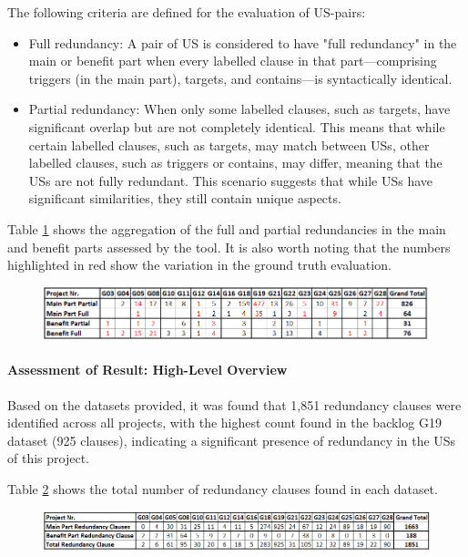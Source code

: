 The following criteria are defined for the evaluation of US-pairs:
\begin{itemize}
	\item Full redundancy: 	A pair of US is considered to have "full redundancy" in the main or benefit part when every labelled clause in that part—comprising triggers (in the main part), targets, and contains—is syntactically identical.
	
	\item Partial redundancy: When only some labelled clauses, such as targets, have significant overlap but are not completely identical. This means that while certain labelled clauses, such as targets, may match between USs, other labelled clauses, such as triggers or contains, may differ, meaning that the USs are not fully redundant. This scenario suggests that while USs have significant similarities, they still contain unique aspects.
\end{itemize}
Table \ref{tb:tool} shows the aggregation of the full and partial redundancies in the main and benefit parts assessed by the tool. It is also worth noting that the numbers highlighted in red show the variation in the ground truth evaluation.
\begin{figure}[h]
	\begingroup
	\scriptsize
	\centering
	\includegraphics[scale=0.6]{Table/tool.png}
	\label{tb:tool}
	\endgroup
\end{figure}
\paragraph{Assessment of Result: High-Level Overview}Based on the datasets provided, it was found that 1,851 redundancy clauses were identified across all projects, with the highest count found in the backlog G19 dataset (925 clauses), indicating a significant presence of redundancy in the USs of this project. 

Table \ref{tb:redundancy_clauses} shows the total number of redundancy clauses found in each dataset.
\begin{figure}[h]
	\begingroup
	\scriptsize
	\centering
	\includegraphics[scale=0.55]{Table/redundancy_clauses.png}
	\label{tb:redundancy_clauses}
	
	\endgroup
\end{figure}
